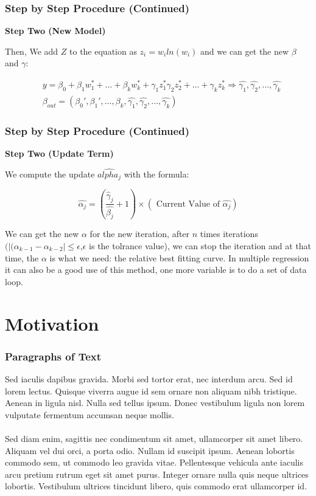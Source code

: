\documentclass[10pt,aspectratio=32]{beamer}
\begin{document}
\begin{frame}
 	\frametitle{Step by Step Procedure (Continued)}
 \textbf{Step Two (New Model)}

Then, We add $Z$ to the equation as $z_i = w_i ln(w_i)$ and we can get the new $\beta$ and $\gamma$:

$$\begin{align*}
&y = \beta_0 + \beta_1 w_1^* + \dots + \beta_k w_k^* + \gamma_1 z_1^* \gamma_2 z_2^* + \dots + \gamma_k z_k^* \Rightarrow \hat{\gamma_1}, \hat{\gamma_2}, \dots, \hat{\gamma_k} \label{eq:new linear regression model}\\
&\beta_{out} = (\beta_0', \beta_1', \dots, \beta_k, \hat{\gamma_1}, \hat{\gamma_2}, \dots, \hat{\gamma_k}) \label{eq:new model coefficient}
\end{align*}$$

\end{frame}

\begin{frame}
 	\frametitle{Step by Step Procedure (Continued)}
 \textbf{Step Two (Update Term)}

 We compute the update $\hat{alpha_j}$ with the formula:

 $$
 	\hat{\alpha_j} = (\frac{\hat{\gamma}_j}{\hat{\beta_j}} + 1) \times (\text{ Current Value of } \hat{\alpha_j})
 $$

We can get the new $\alpha$ for the new iteration, after $n$ times iterations $(|(\alpha_{k-1} - \alpha_{k-2}| \leq \epsilon$,$\epsilon$ is the tolrance value), we can stop the iteration and at that time, the $\alpha$ is what we need: the relative best fitting curve. In multiple regression it can also be a good use of this method, one more variable is to do a set of data loop.
\end{frame}


\section{Motivation}
\begin{frame}
	\frametitle{Paragraphs of Text}
	\vspace{-0.8cm}
	Sed iaculis dapibus gravida. Morbi sed tortor erat, nec interdum arcu. Sed id lorem lectus. Quisque viverra augue id sem ornare non aliquam nibh tristique. Aenean in ligula nisl. Nulla sed tellus ipsum. Donec vestibulum ligula non lorem vulputate fermentum accumsan neque mollis.\\~\\

	Sed diam enim, sagittis nec condimentum sit amet, ullamcorper sit amet libero. Aliquam vel dui orci, a porta odio. Nullam id suscipit ipsum. Aenean lobortis commodo sem, ut commodo leo gravida vitae. Pellentesque vehicula ante iaculis arcu pretium rutrum eget sit amet purus. Integer ornare nulla quis neque ultrices lobortis. Vestibulum ultrices tincidunt libero, quis commodo erat ullamcorper id.
\end{frame}
\end{document}
